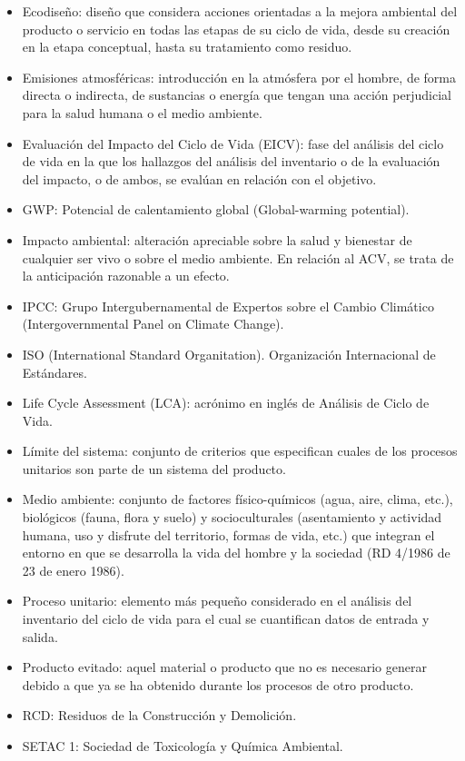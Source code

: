 \begin{itemize}
  \item Ecodiseño: diseño que considera acciones orientadas a la mejora ambiental del producto o servicio en todas las etapas de su ciclo de vida, desde su creación en la etapa conceptual, hasta su tratamiento como residuo.
  \item Emisiones atmosféricas: introducción en la atmósfera por el hombre, de forma directa o indirecta, de sustancias o energía que tengan una acción perjudicial para la salud humana o el medio ambiente.
  \item Evaluación del Impacto del Ciclo de Vida (EICV): fase del análisis del ciclo de vida en la que los hallazgos del análisis del inventario o de la evaluación del impacto, o de ambos, se evalúan en relación con el objetivo.
  \item GWP: Potencial de calentamiento global (Global-warming potential).
  \item Impacto ambiental: alteración apreciable sobre la salud y bienestar de cualquier ser vivo o sobre el medio ambiente. En relación al ACV, se trata de la anticipación razonable a un efecto.
  \item IPCC: Grupo Intergubernamental de Expertos sobre el Cambio Climático (Intergovernmental Panel on Climate Change).
  \item ISO (International Standard Organitation). Organización Internacional de Estándares.
  \item Life Cycle Assessment (LCA): acrónimo en inglés de Análisis de Ciclo de Vida.
  \item Límite del sistema: conjunto de criterios que especifican cuales de los procesos unitarios son parte de un sistema del producto.
  \item Medio ambiente: conjunto de factores físico-químicos (agua, aire, clima, etc.), biológicos (fauna, flora y suelo) y socioculturales (asentamiento y actividad humana, uso y disfrute del territorio, formas de vida, etc.) que integran el entorno en que se desarrolla la vida del hombre y la sociedad (RD 4/1986 de 23 de enero 1986).
  \item Proceso unitario: elemento más pequeño considerado en el análisis del inventario del ciclo de vida para el cual se cuantifican datos de entrada y salida.
  \item Producto evitado: aquel material o producto que no es necesario generar debido a que ya se ha obtenido durante los procesos de otro producto.
  \item RCD: Residuos de la Construcción y Demolición.
  \item SETAC 1: Sociedad de Toxicología y Química Ambiental.

\end{itemize}
